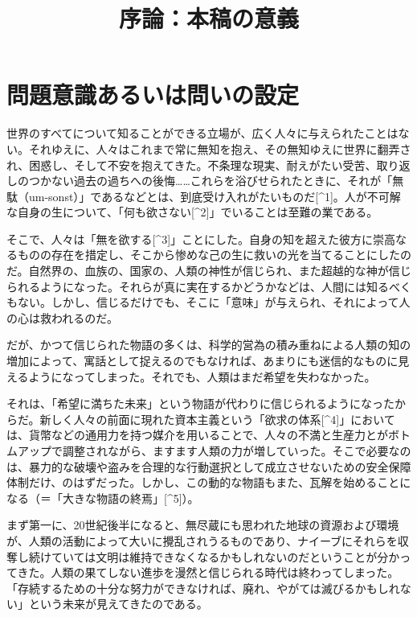 \documentclass[8pt, a5paper]{ltjsarticle}
\title{序論：本稿の意義}
\author{}
\date{}
\begin{document}
\maketitle

\section{問題意識あるいは問いの設定}\label{ux554fux984cux610fux8b58ux3042ux308bux3044ux306fux554fux3044ux306eux8a2dux5b9a}

世界のすべてについて知ることができる立場が、広く人々に与えられたことはない。それゆえに、人々はこれまで常に無知を抱え、その無知ゆえに世界に翻弄され、困惑し、そして不安を抱えてきた。不条理な現実、耐えがたい受苦、取り返しのつかない過去の過ちへの後悔\ldots\ldots これらを浴びせられたときに、それが「無駄（um-sonst）」であるなどとは、到底受け入れがたいものだ{[}\^{}1{]}。人が不可解な自身の生について、「何も欲さない{[}\^{}2{]}」でいることは至難の業である。

そこで、人々は「無を欲する{[}\^{}3{]}」ことにした。自身の知を超えた彼方に崇高なるものの存在を措定し、そこから惨めな己の生に救いの光を当てることにしたのだ。自然界の、血族の、国家の、人類の神性が信じられ、また超越的な神が信じられるようになった。それらが真に実在するかどうかなどは、人間には知るべくもない。しかし、信じるだけでも、そこに「意味」が与えられ、それによって人の心は救われるのだ。

だが、かつて信じられた物語の多くは、科学的営為の積み重ねによる人類の知の増加によって、寓話として捉えるのでもなければ、あまりにも迷信的なものに見えるようになってしまった。それでも、人類はまだ希望を失わなかった。

それは、「希望に満ちた未来」という物語が代わりに信じられるようになったからだ。新しく人々の前面に現れた資本主義という「欲求の体系{[}\^{}4{]}」においては、貨幣などの通用力を持つ媒介を用いることで、人々の不満と生産力とがボトムアップで調整されながら、ますます人類の力が増していった。そこで必要なのは、暴力的な破壊や盗みを合理的な行動選択として成立させないための安全保障体制だけ、のはずだった。しかし、この動的な物語もまた、瓦解を始めることになる（＝「大きな物語の終焉」{[}\^{}5{]}）。

まず第一に、20世紀後半になると、無尽蔵にも思われた地球の資源および環境が、人類の活動によって大いに攪乱されうるものであり、ナイーブにそれらを収奪し続けていては文明は維持できなくなるかもしれないのだということが分かってきた。人類の果てしない進歩を漫然と信じられる時代は終わってしまった。「存続するための十分な努力ができなければ、廃れ、やがては滅びるかもしれない」という未来が見えてきたのである。
\end{document}
